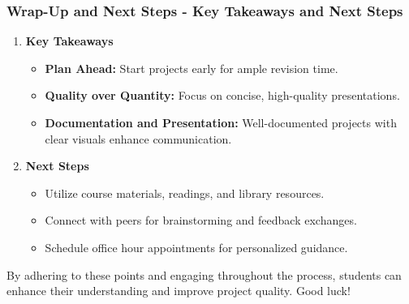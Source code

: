 \documentclass[aspectratio=169]{beamer}
\begin{document}
\begin{frame}[fragile]
    \frametitle{Wrap-Up and Next Steps - Key Takeaways and Next Steps}
    \begin{enumerate}
        \item \textbf{Key Takeaways}
        \begin{itemize}
            \item \textbf{Plan Ahead:} Start projects early for ample revision time.
            \item \textbf{Quality over Quantity:} Focus on concise, high-quality presentations.
            \item \textbf{Documentation and Presentation:} Well-documented projects with clear visuals enhance communication.
        \end{itemize}
        
        \item \textbf{Next Steps}
        \begin{itemize}
            \item Utilize course materials, readings, and library resources.
            \item Connect with peers for brainstorming and feedback exchanges.
            \item Schedule office hour appointments for personalized guidance.
        \end{itemize}
    \end{enumerate}
    By adhering to these points and engaging throughout the process, students can enhance their understanding and improve project quality. Good luck!
\end{frame}
\end{document}
